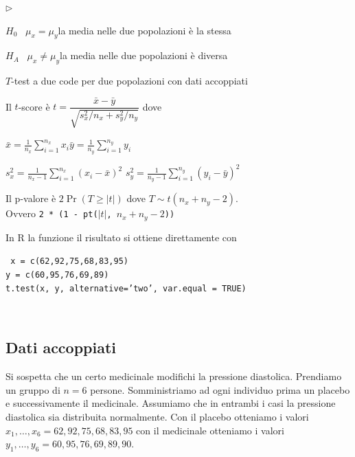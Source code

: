 \documentclass[11pt,openany]{book}
\newcommand{\mylabel}[1]{{\footnotesize\textsf{#1}}\hfill}
\renewenvironment{itemize}
  {\begin{list}{$\triangleright$}{%
   \setlength{\parskip}{0mm}
   \setlength{\topsep}{.2\baselineskip}
   \setlength{\rightmargin}{0mm}
   \setlength{\listparindent}{0mm}
   \setlength{\itemindent}{0mm}
   \setlength{\labelwidth}{3ex}
   \setlength{\itemsep}{.4\baselineskip}
   \setlength{\parsep}{0mm}
   \setlength{\partopsep}{0mm}
   \setlength{\labelsep}{1ex}
   \setlength{\leftmargin}{\labelwidth+\labelsep}
   \let\makelabel\mylabel}}{%
   \end{list}\vspace*{-1.3mm}}
\begin{document}
\begin{itemize}
\item[1.] $H_0$ \ $\mu_x = \mu_y$\hfill la media nelle due popolazioni è la stessa 

\item[2.] $H_A$ \ $\mu_x\neq\mu_y$\hfill la media nelle due popolazioni è diversa 


\item[3.] $T$-test a due code per due popolazioni con dati accoppiati

\item[3.] Il $t$-score è 
$t = \dfrac{\bar x - \bar y}{\sqrt{s^2_x/n_x+s^2_y/n_y}}$ dove 

$\displaystyle\bar x = \frac1{n_x}\sum^{n_x}_{i=1}x_i$\hfil$\displaystyle\bar y = \frac1{n_y}\sum^{n_y}_{i=1}y_i$


$\displaystyle s^2_x= \frac1{n_x-1}\sum^{n_x}_{i=1}(x_i-\bar x)^2$\hfil
$\displaystyle s^2_y= \frac1{n_y-1}\sum^{n_y}_{i=1}(y_i-\bar y)^2$




\item[4.] Il p-valore è $2\Pr(T\ge |t|)$ dove $T\sim t(n_x+n_y-2)$.\\ 
Ovvero {\tt 2 * (1 - pt($|t|$, $n_x+n_y-2$))}

\hrulefill\hfill\hfill

In R la funzione il risultato si ottiene direttamente con

{\tt 
x = c(62,92,75,68,83,95)\\
y = c(60,95,76,69,89)\\
t.test(x, y, alternative='two', var.equal = TRUE)}
\end{itemize}

\hfill{}\clearpage\
\subsection{Dati accoppiati}

Si sospetta che un certo medicinale modifichi la pressione diastolica.  Prendiamo un gruppo di $n=6$ persone. Somministriamo ad ogni individuo prima un placebo e successivamente il medicinale. Assumiamo che in entrambi i casi la pressione diastolica sia distribuita normalmente. Con il placebo otteniamo i valori $x_1,\dots,x_6=62,92,75,68,83,95$ con il medicinale otteniamo i valori $y_1,\dots,y_6=60,95,76,69,89,90$.
\end{document}
